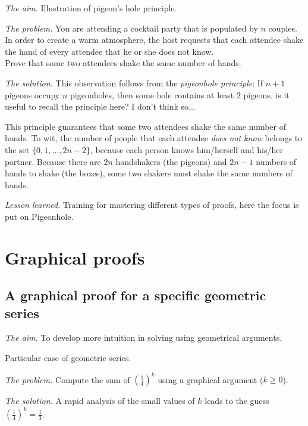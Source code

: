 \noindent \textit{The aim.}
Illustration of pigeon's hole principle.
\medskip

\noindent \textit{The problem.}
You are attending a cocktail party that is populated by $n$ couples.
In order to create a warm atmosphere, the host requests that each
attendee shake the hand of every attendee that he or she does not
know. \\
Prove that some two attendees shake the same number of hands.
\medskip

\noindent \textit{The solution.}
%
This observation follows from the \textit{pigeonhole principle}:
If $n+1$ pigeons occupy $n$ pigeonholes, then some hole contains
at least $2$ pigeons.
{\Denis is it useful to recall the principle here? I don't think so...}

This principle guarantees that some two attendees shake the same
number of hands.  To wit, the number of people that each attendee {\em
  does not know} belongs to the set $\{ 0, 1, \ldots, 2n-2 \}$,
because each person knows him/herself and his/her partner.  Because
there are $2n$ handshakers (the pigeons) and $2n-1$ numbers of hands
to shake (the boxes), some two shakers must shake the same numbers of
hands. 
\medskip

\noindent \textit{Lesson learned.}
Training for mastering different types of proofs, here the focus is put on Pigeonhole.



\section{Graphical proofs}

\subsection{A graphical proof for a specific geometric series}

\noindent \textit{The aim.}
To develop more intuition in solving using geometrical arguments.

Particular case of geometric series.
\medskip

\noindent \textit{The problem.}
Compute the sum of $(\frac{1}{4})^k$ using a graphical argument ($k \geq 0$).
\medskip

\noindent \textit{The solution.}
A rapid analysis of the small values of $k$ leads to the guess $(\frac{1}{4})^k = \frac{1}{3}$.
 
